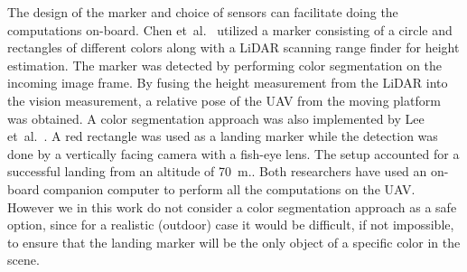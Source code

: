 \documentclass[conference, onecolumn, draftclsnofoot]{IEEEtran}
\begin{document}




The design of the marker and choice of sensors can facilitate doing the computations on-board. %
%
Chen et~al.~\cite{chen2016system} utilized a marker consisting of a
circle and rectangles of different colors along with a LiDAR scanning
range finder for height estimation. The marker was detected by
performing color segmentation on the incoming image frame. By fusing
the height measurement from the LiDAR into the vision measurement, a
relative pose of the UAV from the moving platform was obtained. A
color segmentation approach was also implemented by Lee
et~al.~\cite{lee2016vision}. A red rectangle was used as a landing marker while the detection was done by a vertically facing camera with a fish-eye lens. The setup accounted for a successful landing from an altitude of \SI{70}{\m}.. Both researchers have used an on-board companion computer to
perform all the computations on the UAV. However we in this work do not consider a color segmentation
approach as a safe option, since for a realistic (outdoor)
case it would be difficult, if not impossible, to ensure that the
landing marker will be the only object of a specific color in the
scene.

\end{document}
